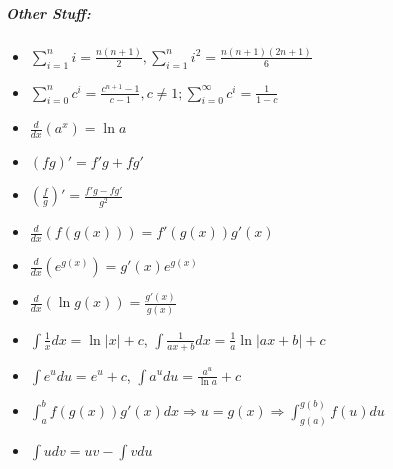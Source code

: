 \documentclass[landscape,10pt]{article}
\begin{document}
\begin{multicols}{4}
    \subparagraph*{Other Stuff:}
    \begin{itemize}
        \item[] \(\sum\limits_{i=1}^{n}i = \frac{n(n+1)}{2},\sum\limits_{i=1}^{n}i^2 = \frac{n(n+1)(2n+1)}{6}\)
        \item[] \(\sum\limits_{i=0}^{n}c^i = \frac{c^{n+1}-1}{c-1}, c \neq 1; \sum\limits_{i=0}^{\infty}c^i = \frac{1}{1-c}\)
        \item[] \(\frac{d}{dx}(a^x) = \ln a\)
        \item[] \((fg)' = f'g + fg'\)
        \item[] \(\left(\frac{f}{g}\right)' = \frac{f'g-fg'}{g^2}\)
        \item[] \(\frac{d}{dx}(f(g(x)))=f'(g(x))g'(x)\)
        \item[] \(\frac{d}{dx}(e^{g(x)})= g'(x)e^{g(x)}\)
        \item[] \(\frac{d}{dx}(\ln g(x)) = \frac{g'(x)}{g(x)}\)
        \item[] \(\int \frac{1}{x}dx = \ln |x| + c\), \(\int \frac{1}{ax+b}dx=\frac{1}{a}\ln |ax+b|+c\)
        \item[] \(\int e^u du = e^u + c\), \(\int {a^u}du = \frac{a^u}{\ln a} + c\)
        \item[] \(\int_{a}^{b}{f(g(x))g'(x)}dx \Rightarrow u=g(x) \Rightarrow \int_{g(a)}^{g(b)}f(u)du\)
        \item[] \(\int udv = uv - \int vdu\)
    \end{itemize}
    \end{multicols}
\end{document}
